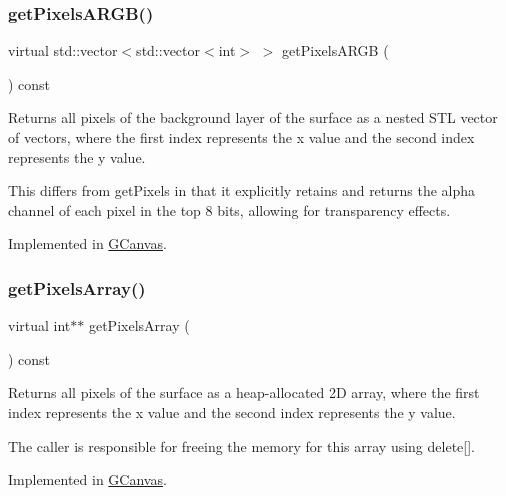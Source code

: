 \subsubsection{\texorpdfstring{get\+Pixels\+A\+R\+G\+B()}{getPixelsARGB()}}
{\footnotesize\ttfamily virtual std\+::vector$<$std\+::vector$<$int$>$ $>$ get\+Pixels\+A\+R\+GB (\begin{DoxyParamCaption}{ }\end{DoxyParamCaption}) const\hspace{0.3cm}{\ttfamily [pure virtual]}}



Returns all pixels of the background layer of the surface as a nested S\+TL vector of vectors, where the first index represents the x value and the second index represents the y value. 

This differs from get\+Pixels in that it explicitly retains and returns the alpha channel of each pixel in the top 8 bits, allowing for transparency effects. 

Implemented in \mbox{\hyperlink{classsgl_1_1GCanvas_a07228643bf746aad52b1976626bc1a10}{G\+Canvas}}.

\mbox{\label{classsgl_1_1GDrawingSurface_ab42bd04a0a8ad87ec0c7e9856e4da3ac}} 
\subsubsection{\texorpdfstring{get\+Pixels\+Array()}{getPixelsArray()}}
{\footnotesize\ttfamily virtual int$\ast$$\ast$ get\+Pixels\+Array (\begin{DoxyParamCaption}{ }\end{DoxyParamCaption}) const\hspace{0.3cm}{\ttfamily [pure virtual]}}



Returns all pixels of the surface as a heap-\/allocated 2D array, where the first index represents the x value and the second index represents the y value. 

The caller is responsible for freeing the memory for this array using delete\mbox{[}\mbox{]}. 

Implemented in \mbox{\hyperlink{classsgl_1_1GCanvas_a92e494e15293328503821bbe388d7933}{G\+Canvas}}.

